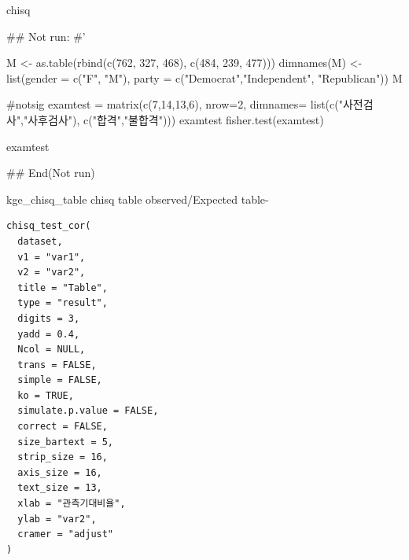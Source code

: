 \documentclass[a4paper]{book}
\begin{document}
%
\begin{Value}
chisq
\end{Value}
%
\begin{Examples}
\begin{ExampleCode}

## Not run: 
#'


M <- as.table(rbind(c(762, 327, 468), c(484, 239, 477)))
dimnames(M) <- list(gender = c("F", "M"),
                    party = c("Democrat","Independent", "Republican"))
M %

#notsig
examtest  = matrix(c(7,14,13,6), nrow=2,
                   dimnames= list(c("사전검사","사후검사"),
                                  c("합격","불합격")))
examtest
fisher.test(examtest)

examtest %

## End(Not run)


\end{ExampleCode}
\end{Examples}
%
\begin{Description}
kge\_chisq\_table chisq table observed/Expected table-
\end{Description}
%
\begin{Usage}
\begin{verbatim}
chisq_test_cor(
  dataset,
  v1 = "var1",
  v2 = "var2",
  title = "Table",
  type = "result",
  digits = 3,
  yadd = 0.4,
  Ncol = NULL,
  trans = FALSE,
  simple = FALSE,
  ko = TRUE,
  simulate.p.value = FALSE,
  correct = FALSE,
  size_bartext = 5,
  strip_size = 16,
  axis_size = 16,
  text_size = 13,
  xlab = "관측기대비율",
  ylab = "var2",
  cramer = "adjust"
)
\end{verbatim}
\end{Usage}
%
\end{document}
